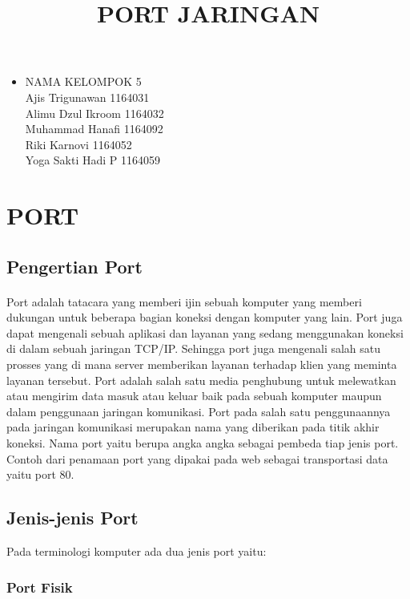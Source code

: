 \documentclass[12pt,a4paper]{article}
\begin{document}
\title{PORT JARINGAN}
\date{}
\maketitle

\begin{itemize}
\item
NAMA KELOMPOK 5\\
Ajis Trigunawan			1164031\\
Alimu Dzul Ikroom		1164032\\
Muhammad Hanafi			1164092\\
Riki Karnovi			1164052\\
Yoga Sakti Hadi P		1164059\\
\end{itemize}

\section{PORT}
\subsection{Pengertian Port}
\paragraph{}
\hspace{1cm}
Port adalah tatacara yang memberi ijin sebuah komputer yang memberi dukungan untuk beberapa bagian koneksi dengan komputer yang lain. Port juga dapat mengenali sebuah aplikasi dan layanan yang sedang menggunakan koneksi di dalam sebuah jaringan TCP/IP. Sehingga port juga mengenali salah satu prosses yang di mana server memberikan layanan terhadap klien yang meminta layanan tersebut. Port adalah salah satu media penghubung untuk melewatkan atau mengirim data masuk atau keluar baik pada sebuah komputer maupun dalam penggunaan jaringan komunikasi. Port pada salah satu penggunaannya pada jaringan komunikasi merupakan nama yang diberikan pada titik akhir koneksi. Nama port yaitu berupa angka angka sebagai pembeda tiap  jenis port. Contoh dari penamaan port yang dipakai pada web sebagai transportasi data yaitu port 80.


\subsection{Jenis-jenis Port}
Pada terminologi komputer ada dua jenis port yaitu:
\subsubsection {Port Fisik}
\end{document}
